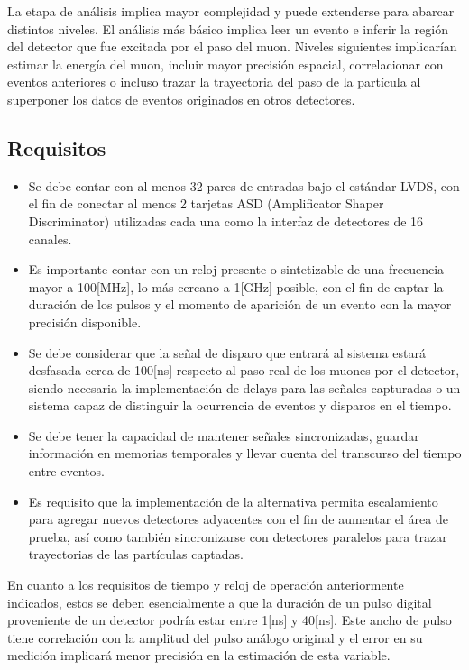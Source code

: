 	La etapa de análisis implica mayor complejidad y puede extenderse para abarcar distintos niveles. El análisis más básico implica leer un evento e inferir la región del detector que fue excitada por el paso del muon. Niveles siguientes implicarían estimar la energía del muon, incluir mayor precisión espacial, correlacionar con eventos anteriores o incluso trazar la trayectoria  del paso de la partícula al superponer los datos de eventos originados en otros detectores.

\newpage
\subsection{Requisitos}
	
	\begin{itemize}
		\item Se debe contar con al menos 32 pares de entradas bajo el estándar LVDS, con el fin de conectar al menos 2 tarjetas ASD (Amplificator Shaper Discriminator) utilizadas cada una como la interfaz de detectores de 16 canales.
		\item Es importante contar con un reloj presente o sintetizable de una frecuencia mayor a 100[MHz], lo más cercano a 1[GHz] posible, con el fin de captar la duración de los pulsos y el momento de aparición de un evento con la mayor precisión disponible.
		\item Se debe considerar que la señal de disparo que entrará al sistema estará desfasada cerca de 100[ns] respecto al paso real de los muones por el detector, siendo necesaria la implementación de delays para las señales capturadas o un sistema capaz de distinguir la ocurrencia de eventos y disparos en el tiempo.
		\item  Se debe tener la capacidad de mantener señales sincronizadas, guardar información en memorias temporales y llevar cuenta del transcurso del tiempo entre eventos.
		\item Es requisito que la implementación de la alternativa permita escalamiento para agregar nuevos detectores adyacentes con el fin de aumentar el área de prueba, así como también sincronizarse con detectores paralelos para trazar trayectorias de las partículas captadas.
	\end{itemize}
	
	En cuanto a los requisitos de tiempo y reloj de operación anteriormente indicados, estos se deben esencialmente a que la duración de un pulso digital proveniente de un detector podría estar entre 1[ns] y 40[ns]\cite{1999ATLASICs}. Este ancho de pulso tiene correlación con la amplitud del pulso análogo original y el error en su medición implicará menor precisión en la estimación de esta variable.
	
